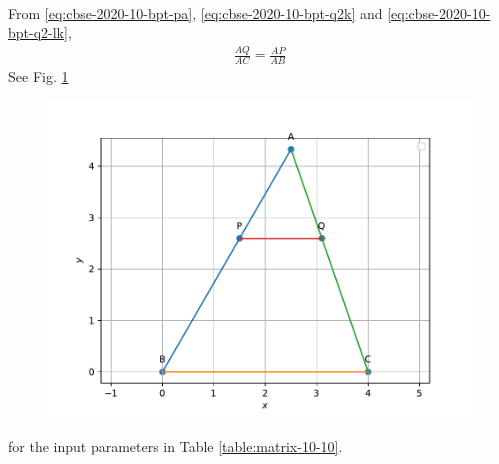 \documentclass[journal,12pt,twocolumn]{IEEEtran}
\renewcommand\thesection{\arabic{section}}
\begin{document}
\begin{enumerate}[label=\thesection.\arabic*.,ref=\thesection.\theenumi]
\begin{align}
		\end{align}
		From 
			\eqref{eq:cbse-2020-10-bpt-pa},  
			\eqref{eq:cbse-2020-10-bpt-q2k} and
			\eqref{eq:cbse-2020-10-bpt-q2-lk},
			\begin{align}
				\frac{AQ}{AC} = \frac{AP}{AB}
			\end{align}
    See Fig. 
	  \ref{fig:matrix-10-10.pdf}
  \begin{figure}
	  \centering 
	  \includegraphics[width=\columnwidth]{figs/matrix-10-10.pdf}
	  \caption{}
	  \label{fig:matrix-10-10.pdf}
	  \end{figure}
	  for the input parameters in  Table
\ref{table:matrix-10-10}.	
\begin{table}[ht!]
	
\caption{}
\label{table:matrix-10-10}	
\end{table}
		

\end{enumerate}
\end{document}
